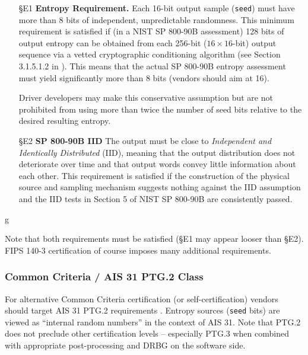     \begin{itemize}

    \item[\S E1]    {\bf Entropy Requirement.}
    Each 16-bit output sample (\verb|seed|) must have more than 8 bits of
    independent, unpredictable randomness. This minimum requirement is
    satisfied if (in a NIST SP 800-90B \cite{TuBaKe+18} assessment) 128
    bits of output entropy can be obtained from each 256-bit
    ($16 \times 16$-bit)  output sequence via a vetted
    cryptographic conditioning algorithm (see Section 3.1.5.1.2 in
    \cite{TuBaKe+18}). This means that the actual SP 800-90B entropy
    assessment must yield significantly more than 8 bits (vendors should
    aim at 16).

    Driver developers may make this conservative assumption but are not
    prohibited from using more than twice the number of seed bits relative
    to the desired resulting entropy.

    \item[\S E2]    {\bf SP 800-90B IID}
    The output must be close to \emph{Independent and Identically Distributed}
    (IID), meaning that the output distribution does not deteriorate over
    time and that output words convey little information about each other.
    This requirement is satisfied if the construction of the physical source
    and sampling mechanism suggests nothing against the IID assumption
    and the IID tests in Section 5 of NIST SP 800-90B \cite{TuBaKe+18} are
    consistently passed.

    \end{itemize}g

    Note that both requirements must be satisfied (\S E1 may appear looser
    than \S E2). FIPS 140-3 certification of course imposes many additional
    requirements.


    \subsubsection{Common Criteria / AIS 31 PTG.2 Class}

    For alternative Common Criteria certification (or self-certification)
    vendors should target AIS 31 PTG.2 requirements \cite[Sect. 4.3.]{KiSc11}.
    Entropy sources (\verb|seed| bits) are viewed as ``internal random
    numbers'' in the context of AIS 31. Note that PTG.2 does not preclude
    other certification levels -- especially PTG.3 when combined with
    appropriate post-processing and DRBG on the software side.

